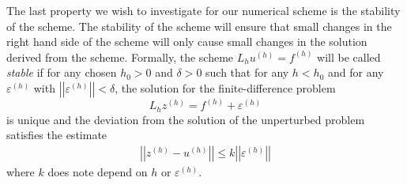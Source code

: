 The last property we wish to investigate for our numerical scheme is the
stability of the scheme. The stability of the scheme will ensure that small
changes in the right hand side of the scheme will only cause small changes in
the solution derived from the scheme. Formally, the scheme $L_h u^{(h)} = f^{(h)}$
will be called \textit{stable} if for any chosen $h_0 > 0$ and $\delta > 0$ such
that for any $h < h_0$ and for any $\varepsilon^{(h)}$ with
$\left|\left| \varepsilon^{(h)} \right|\right| < \delta$, the solution for the
finite-difference problem
$$L_h z^{(h)} = f^{(h)} + \varepsilon^{(h)}$$
is unique and the deviation from the solution of the unperturbed problem satisfies
the estimate
\begin{align}\label{stability_ineq}
  \left|\left| z^{(h)} - u^{(h)} \right|\right| \leq k \left|\left| \varepsilon^{(h)} \right|\right|
\end{align}
where $k$ does note depend on $h$ or $\varepsilon^{(h)}$.